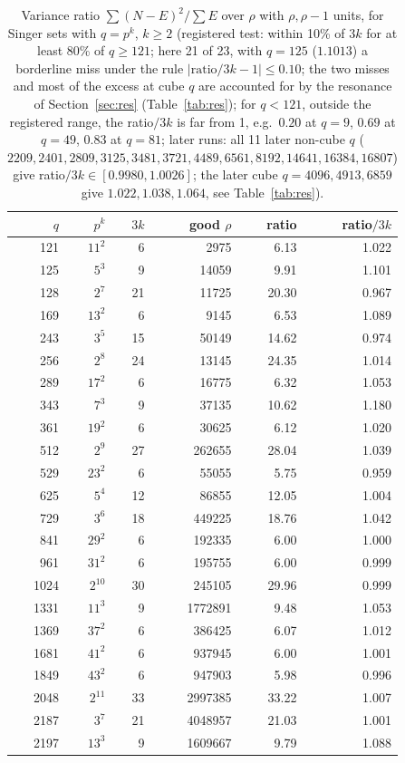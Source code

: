 \documentclass[11pt]{article}
\begin{document}
\begin{table}[h]\centering\small
\begin{tabular}{rrrrrr}\toprule $q$&$p^k$&$3k$&good $\rho$&ratio&ratio$/3k$\\ \midrule
121&$11^{2}$&6&2975&6.13&1.022\\
125&$5^{3}$&9&14059&9.91&1.101\\
128&$2^{7}$&21&11725&20.30&0.967\\
169&$13^{2}$&6&9145&6.53&1.089\\
243&$3^{5}$&15&50149&14.62&0.974\\
256&$2^{8}$&24&13145&24.35&1.014\\
289&$17^{2}$&6&16775&6.32&1.053\\
343&$7^{3}$&9&37135&10.62&1.180\\
361&$19^{2}$&6&30625&6.12&1.020\\
512&$2^{9}$&27&262655&28.04&1.039\\
529&$23^{2}$&6&55055&5.75&0.959\\
625&$5^{4}$&12&86855&12.05&1.004\\
729&$3^{6}$&18&449225&18.76&1.042\\
841&$29^{2}$&6&192335&6.00&1.000\\
961&$31^{2}$&6&195755&6.00&0.999\\
1024&$2^{10}$&30&245105&29.96&0.999\\
1331&$11^{3}$&9&1772891&9.48&1.053\\
1369&$37^{2}$&6&386425&6.07&1.012\\
1681&$41^{2}$&6&937945&6.00&1.001\\
1849&$43^{2}$&6&947903&5.98&0.996\\
2048&$2^{11}$&33&2997385&33.22&1.007\\
2187&$3^{7}$&21&4048957&21.03&1.001\\
2197&$13^{3}$&9&1609667&9.79&1.088\\
\bottomrule\end{tabular}
\caption{Variance ratio $\sum(N-E)^2/\sum E$ over $\rho$ with $\rho,\rho-1$ units, for Singer sets with $q=p^k$, $k\ge2$ (registered test: within 10\% of $3k$ for at least 80\% of $q\ge121$; here 21 of 23, with $q=125$ ($1.1013$) a borderline miss under the rule $|\mathrm{ratio}/3k-1|\le0.10$; the two misses and most of the excess at cube $q$ are accounted for by the resonance of Section~\ref{sec:res} (Table~\ref{tab:res}); for $q<121$, outside the registered range, the ratio$/3k$ is far from 1, e.g.\ $0.20$ at $q=9$, $0.69$ at $q=49$, $0.83$ at $q=81$; later runs: all 11 later non-cube $q$ ($2209,2401,2809,3125,3481,3721,4489,6561,8192,14641,16384,16807$) give ratio$/3k\in[0.9980,1.0026]$; the later cube $q=4096,4913,6859$ give $1.022,1.038,1.064$, see Table~\ref{tab:res}).}\label{tab:pp}\end{table}
\end{document}
